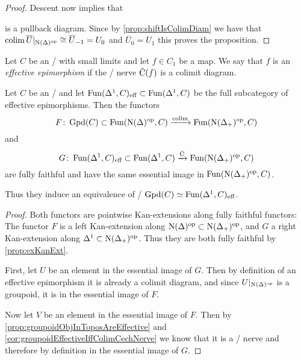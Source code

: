 \begin{prop}
\begin{proof}
        Descent now implies that 
        \begin{center}
        \end{center}
        is a pullback diagram.
        Since by \cref{prop:shiftIsColimDiam} we have that $\operatorname*{colim}\overline{U}|_{\operatorname{N}(\Delta)^{\operatorname{op}}}\cong\overline{U}_{-1} = U_0$ and $\overline{U}_0=U_1$ this proves the proposition.
    \end{proof}
\end{prop}
\begin{definition}
    Let $C$ be an \inftycat/ with small limits and let $f\in C_1$ be a map.
    We say that $f$ is an \emph{effective epimorphism} if the \Cech/ nerve $\CN(f)$ is a colimit diagram.
\end{definition}
\begin{prop}\label{prop:mayRecognitionTheoremGroupoid}
    Let $C$ be an \inftytop/ and let $\operatorname{Fun}(\Delta^1,C)_{\text{eff}}\subset\operatorname{Fun}(\Delta^1,C)$ be the full subcategory of effective epimorphisms.  
    Then the functors
    \begin{equation*}
        F\colon\operatorname{Gpd}(C)\subset\operatorname{Fun}(\operatorname{N}(\Delta)^{\operatorname{op}},C)\xrightarrow{\operatorname*{colim}}\operatorname{Fun}(\operatorname{N}(\Delta_+)^{\operatorname{op}},C)
    \end{equation*}
    and 
    \begin{equation*}
        G\colon\Fun(\Delta^1,C)_{\text{eff}}\subset\Fun(\Delta^1,C)\xrightarrow{\CN}\Fun(\N(\Delta_+)^{\op},C)
    \end{equation*}
    are fully faithful and have the same essential image in $\operatorname{Fun}(\operatorname{N}(\Delta_+)^{\operatorname{op}},C)$.
    
    Thus they induce an equivalence of \inftycats/ $\operatorname{Gpd}(C)\simeq\operatorname{Fun}(\Delta^1,C)_{\text{eff}}$.
    \begin{proof}
        Both functors are pointwise Kan-extensions along fully faithful functors:
        The functor $F$ is a left Kan-extension along $\operatorname{N}(\Delta)^{\operatorname{op}}\subset\operatorname{N}(\Delta_+)^{\operatorname{op}}$, and $G$ a right Kan-extension along $\Delta^1\subset\operatorname{N}(\Delta_+)^{\operatorname{op}}$.
        Thus they are both fully faithful by \cref{prop:exKanExt}.

        First, let $U$ be an element in the essential image of $G$. 
        Then by definition of an effective epimorphism it is already a colimit diagram, and since $U|_{\operatorname{N}(\Delta)^{\operatorname{op}}}$ is a groupoid, it is in the essential image of $F$.

        Now let $V$ be an element in the essential image of $F$. 
        Then by \cref{prop:groupoidObjInToposAreEffective} and \cref{cor:groupoidEffectiveIffColimCechNerve} we know that it is a \Cech/ nerve and therefore by definition in the essential image of $G$.
    \end{proof}
\end{prop}
